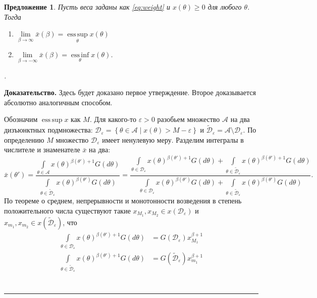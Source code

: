 \documentclass[12pt]{article}
\newtheorem{proposition}{Предложение}
\newenvironment{proof}[1][Доказательство]{\noindent\textbf{#1.} }{\ \rule{0.5em}{0.5em}}
\DeclareMathOperator*{\esssup}{ess\,sup}
\DeclareMathOperator*{\essinf}{ess\,inf}
\begin{document}
\begin{proposition}
Пусть веса заданы как \eqref{eq:weight} и $x(\theta) \geq 0$ для любого $\theta$.  Тогда 
\begin{enumerate}
\item $\lim\limits_{\beta \to\infty} \bar{x}(\beta) = \esssup\limits_{\theta} x(\theta)$
\item $\lim\limits_{\beta \to-\infty} \bar{x}(\beta) = \essinf\limits_{\theta} x(\theta)$.
\end{enumerate}.
\end{proposition}
\begin{proof}
Здесь будет доказано первое утверждение.  Второе доказывается абсолютно аналогичным способом.

Обозначим $\esssup x$ как $M$.   Для какого-то $\varepsilon > 0$ разобьем множество $\mathcal{A}$ на два дизъюнктных подмножества: 
$\mathcal{D}_\varepsilon = \left\{ \theta \in \mathcal{A} \mid x(\theta) > M - \varepsilon \right\}$
и 
$ \widetilde{\mathcal{D}}_\varepsilon = \mathcal{A} \setminus \mathcal{D}_\varepsilon.$
По определению $M$ множество $\mathcal{D}_\varepsilon$ имеет ненулевую меру.
Разделим интегралы в числителе и знаменателе $\bar{x}$ на два:
\begin{equation*}
\bar{x}(\theta') = 
\frac{\int\limits_{\theta \in \mathcal{A}}x(\theta)^{\beta(\theta')+1}G(d \theta)}{\int\limits_{\theta \in \widetilde{\mathcal{D}}_\varepsilon} x(\theta)^{\beta(\theta')}G(d \theta)} = 
\frac{\int\limits_{\theta \in \mathcal{D}_\varepsilon}x(\theta)^{\beta(\theta')+1}G(d \theta) + \int\limits_{\theta \in \widetilde{\mathcal{D}}_\varepsilon}x(\theta)^{\beta(\theta')+1}G(d \theta)}{\int\limits_{\theta \in \mathcal{D}_\varepsilon} x(\theta)^{\beta(\theta')}G(d \theta) + \int\limits_{\theta \in \widetilde{\mathcal{D}}_\varepsilon} x(\theta)^{\beta(\theta')}G(d \theta)}.
\end{equation*}
По теореме о среднем,  непрерывности и монотонности возведения в степень положительного числа существуют такие $x_{M_1},  x_{M_2} \in x(\mathcal{D}_\varepsilon)$ и $x_{m_1}, x_{m_2} \in x(\widetilde{\mathcal{D}}_\varepsilon)$,  что
\begin{align*}
\int\limits_{\theta \in \mathcal{D}_\varepsilon}x(\theta)^{\beta(\theta')+1}G(d \theta) &= G(\mathcal{D}_\varepsilon) x_{M_1}^{\beta + 1}  \\
\int\limits_{\theta \in \widetilde{\mathcal{D}}_\varepsilon}x(\theta)^{\beta(\theta')+1}G(d \theta) &= G(\widetilde{\mathcal{D}}_\varepsilon) x_{m_1}^{\beta+1}\\

\end{align*}
\end{proof}
\end{document}
